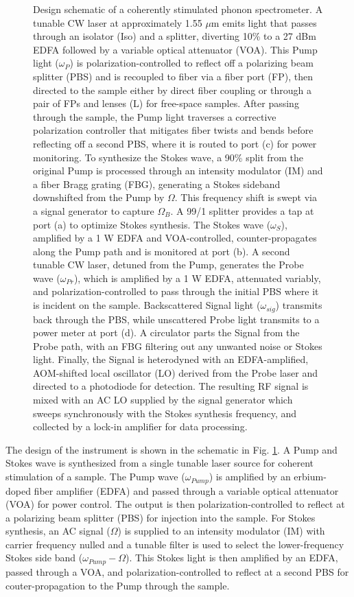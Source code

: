 \documentclass[%
  reprint,
  superscriptaddress,
  amsmath,amssymb,
  aps,
  prapplied,
]{revtex4-2}
\begin{document}
\begin{figure}[htbp]
{Design schematic of a coherently stimulated phonon spectrometer. A tunable CW laser at approximately 1.55 $\mu$m emits light that passes through an isolator (Iso) and a splitter, diverting 10\% to a 27 dBm EDFA followed by a variable optical attenuator (VOA). This Pump light ($\omega_P$) is polarization-controlled to reflect off a polarizing beam splitter (PBS) and is recoupled to fiber via a fiber port (FP), then directed to the sample either by direct fiber coupling or through a pair of FPs and lenses (L) for free-space samples. After passing through the sample, the Pump light traverses a corrective polarization controller that mitigates fiber twists and bends before reflecting off a second PBS, where it is routed to port (c) for power monitoring. To synthesize the Stokes wave, a 90\% split from the original Pump is processed through an intensity modulator (IM) and a fiber Bragg grating (FBG), generating a Stokes sideband downshifted from the Pump by $\Omega$. This frequency shift is swept via a signal generator to capture $\Omega_B$. A 99/1 splitter provides a tap at port (a) to optimize Stokes synthesis. The Stokes wave ($\omega_S$), amplified by a 1 W EDFA and VOA-controlled, counter-propagates along the Pump path and is monitored at port (b). A second tunable CW laser, detuned from the Pump, generates the Probe wave ($\omega_{Pr}$), which is amplified by a 1 W EDFA, attenuated variably, and polarization-controlled to pass through the initial PBS where it is incident on the sample. Backscattered Signal light ($\omega_{sig}$) transmits back through the PBS, while unscattered Probe light transmits to a power meter at port (d). A circulator parts the Signal from the Probe path, with an FBG filtering out any unwanted noise or Stokes light. Finally, the Signal is heterodyned with an EDFA-amplified, AOM-shifted local oscillator (LO) derived from the Probe laser and directed to a photodiode for detection. The resulting RF signal is mixed with an AC LO supplied by the signal generator which sweeps synchronously with the Stokes synthesis frequency, and collected by a lock-in amplifier for data processing.
}
\label{fig:Instrument Design}
\end{figure}

The design of the instrument is shown in the schematic in Fig. \ref{fig:Instrument Design}. A Pump and Stokes wave is synthesized from a single tunable laser source for coherent stimulation of a sample. The Pump wave ($\omega_{Pump}$) is amplified by an erbium-doped fiber amplifier (EDFA) and passed through a variable optical attenuator (VOA) for power control. The output is then polarization-controlled to reflect at a polarizing beam splitter (PBS) for injection into the sample. For Stokes synthesis, an AC signal ($\Omega$) is supplied to an intensity modulator (IM) with carrier frequency nulled and a tunable filter is used to select the lower-frequency Stokes side band ($\omega_{Pump} - \Omega$). This Stokes light is then amplified by an EDFA, passed through a VOA, and polarization-controlled to reflect at a second PBS for couter-propagation to the Pump through the sample.
\end{document}

